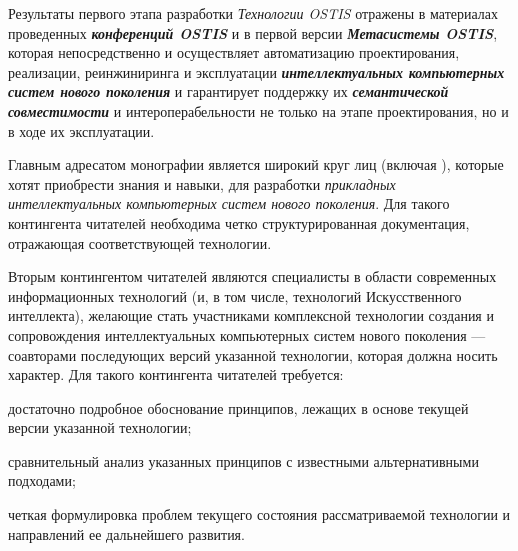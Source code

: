 \begin{partbacktext}
\begin{comment}
\end{comment}

Результаты первого этапа разработки \textit{Технологии OSTIS} отражены в материалах проведенных \textbf{\textit{конференций OSTIS}} и в первой версии \textbf{\textit{Метасистемы OSTIS}}, которая непосредственно и осуществляет автоматизацию проектирования, реализации, реинжиниринга и эксплуатации \textbf{\textit{интеллектуальных компьютерных систем нового поколения}} и гарантирует поддержку их \textbf{\textit{семантической совместимости}} и интероперабельности не только на этапе проектирования, но и в ходе их эксплуатации.
\begin{comment}
На следующем этапе разработки \textit{Технологии поддержки жизненного цикла интеллектуальных компьютерных систем нового поколения} требуется существенное расширение фронта работ и соответствующего авторского коллектива. Этому, в частности, была посвящена \textit{Конференция OSTIS-2022} (24-26 ноября 2022 года), которая внесла важный вклад в развитие открытого проекта развития технологии комплексной поддержки жизненного цикла интеллектуальных компьютерных систем нового поколения (\textit{Проекта OSTIS}). Предлагаемая вашему вниманию монография является результатом работы указанного авторского коллектива.
\end{comment}
Главным адресатом монографии является широкий круг лиц (включая ), которые хотят  приобрести знания и навыки, для разработки \textit{прикладных интеллектуальных компьютерных систем нового поколения}. Для такого контингента читателей необходима четко структурированная документация, отражающая   соответствующей технологии.

Вторым контингентом читателей являются специалисты в области современных информационных технологий (и, в том числе, технологий Искусственного интеллекта), желающие стать участниками   комплексной технологии создания и сопровождения интеллектуальных компьютерных систем нового поколения --- соавторами последующих версий указанной технологии, которая должна носить  характер. Для такого контингента читателей требуется:
\begin{textitemize}
	\item достаточно подробное обоснование принципов, лежащих в основе текущей версии указанной технологии; 
	\item сравнительный анализ указанных принципов с известными альтернативными подходами; 
	\item четкая формулировка проблем текущего состояния рассматриваемой технологии и направлений ее дальнейшего развития.
\end{textitemize}


\end{partbacktext}
